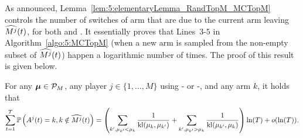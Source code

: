 



As announced, Lemma~\ref{lem:5:elementaryLemma_RandTopM_MCTopM} controls
the number of switches of arm that are due to the current arm leaving $\widehat{M^j}(t)$,
for both \RandTopM{} and \MCTopM{}. It essentially proves that Lines~$3$-$5$ in Algorithm~\ref{algo:5:MCTopM} (when a new arm is sampled from the non-empty subset of $\widehat{M^j}(t)$)
happen a logarithmic number of times. The proof of this result is given below.

\begin{lemma}\label{lem:5:elementaryLemma_RandTopM_MCTopM}
  For any $\boldsymbol{\mu}\in\mathcal{P}_M$,
  any player $j \in \{1, \dots, M\}$ using
  \RandTopM- or \MCTopM-\klUCB,
  and any arm $k$,
  it holds that
  \begin{equation*}
    \sum_{t=1}^T
    \mathbb{P}\left(A^j(t)=k, k\notin \widehat{M^j}(t)\right)
    = \left(\sum_{k', \mu_{k'} < \mu_k}\frac{1}{\mathrm{kl}(\mu_k,\mu_{k'})} + \sum_{k', \mu_{k'} > \mu_k}\frac{1}{\mathrm{kl}(\mu_{k'},\mu_{k})}\right) \ln(T) + o(\ln(T)).
  \end{equation*}
\end{lemma}


